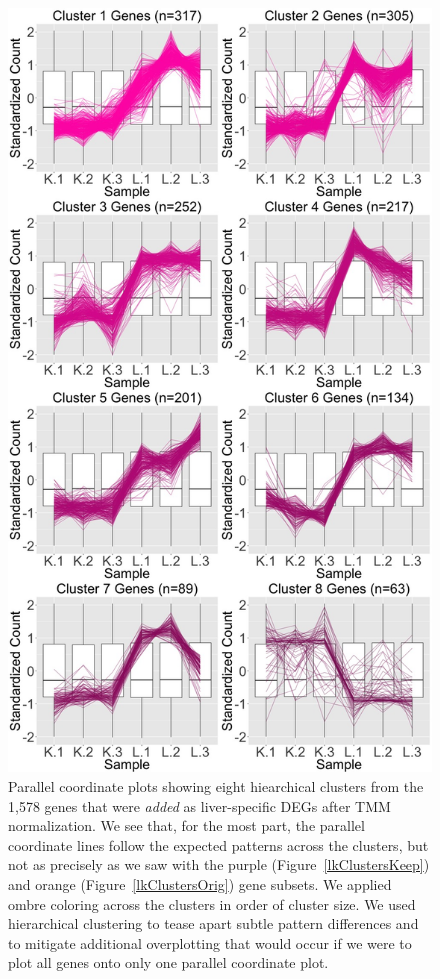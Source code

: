 \documentclass[11pt,a4paper,oldfontcommands,openany]{memoir}
\numberwithin{equation}{section} %
\begin{document}
\null
\begin{figure}[t!]
\begin{framed}
\centerline{\includegraphics[width=0.65\columnwidth]{MakeFigures/lkClustersAdd.jpg}}
\end{framed}
\caption{Parallel coordinate plots showing eight hiearchical clusters from the 1,578 genes that were \textit{added} as liver-specific DEGs after TMM normalization. We see that, for the most part, the parallel coordinate lines follow the expected patterns across the clusters, but not as precisely as we saw with the purple (Figure~\ref{lkClustersKeep}) and orange (Figure~\ref{lkClustersOrig}) gene subsets. We applied ombre coloring across the clusters in order of cluster size. We used hierarchical clustering to tease apart subtle pattern differences and to mitigate additional overplotting that would occur if we were to plot all genes onto only one parallel coordinate plot.
\label{lkClustersAdd}}
\end{figure}
\end{document}
